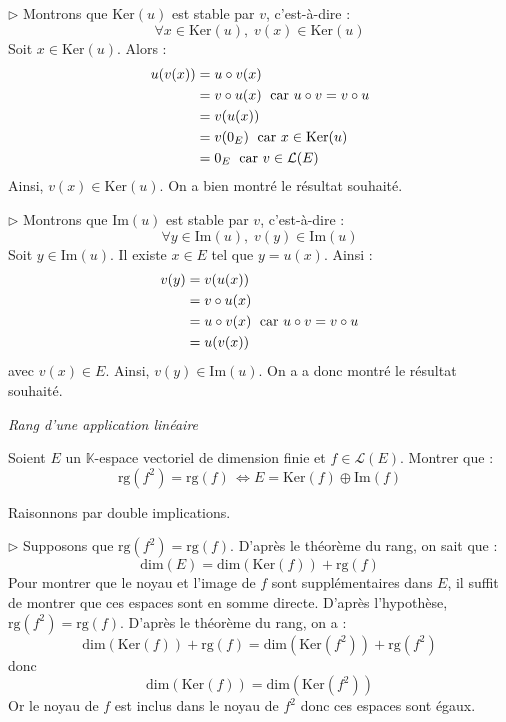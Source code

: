 \documentclass[a4paper,10pt]{report}
\begin{document}
\noindent $\rhd$ Montrons que $\textrm{Ker}(u)$ est stable par $v$, c'est-à-dire :
$$ \forall x \in \textrm{Ker}(u), \; v(x) \in \textrm{Ker}(u)$$
Soit $x \in \textrm{Ker}(u)$. Alors :
\begin{align*}
u (v(x)) & = u \circ v (x) \\
& = v \circ u (x) \; \hbox{ car } u \circ v = v \circ u \\
& = v(u(x)) \\
& = v(0_E) \; \hbox{ car } x \in \textrm{Ker}(u) \\
& = 0_E \; \hbox{ car } v \in \mathcal{L}(E)
\end{align*}
Ainsi, $v(x) \in \textrm{Ker}(u)$. On a bien montré le résultat souhaité.

\medskip

\noindent $\rhd$ Montrons que $\textrm{Im}(u)$ est stable par $v$, c'est-à-dire :
$$ \forall y \in \textrm{Im}(u), \; v(y) \in \textrm{Im}(u)$$
Soit $y \in \textrm{Im}(u)$. Il existe $x \in E$ tel que $y = u(x)$. Ainsi :
\begin{align*}
v(y) & = v (u(x)) \\
& = v \circ u(x) \\
& = u \circ v(x) \; \hbox{ car } u \circ v = v \circ u \\
& = u (v(x)) 
\end{align*}
avec $v(x) \in E$. Ainsi, $v(y) \in \textrm{Im}(u)$. On a a donc montré le résultat souhaité.


\medskip


\begin{center}
\textit{{ {\large Rang d'une application linéaire}}}
\end{center}

\medskip


\begin{Exa} Soient $E$ un $\mathbb{K}$-espace vectoriel de dimension finie et $f \in \mathcal{L}(E)$. Montrer que :
$$ \textrm{rg}(f^2 ) =  \textrm{rg}( f ) \, \Longleftrightarrow E = \textrm{Ker}(f) \oplus \textrm{Im}(f) $$
\end{Exa}

\corr Raisonnons par double implications.

\medskip

\noindent $\rhd$ Supposons que $\textrm{rg}(f^2 ) =  \textrm{rg}( f )$. D'après le théorème du rang, on sait que :
$$ \textrm{dim}(E) = \textrm{dim}( \textrm{Ker}(f)) + \textrm{rg}( f )$$
Pour montrer que le noyau et l'image de $f$ sont supplémentaires dans $E$, il suffit de montrer que ces espaces sont en somme directe. D'après l'hypothèse, $\textrm{rg}(f^2 ) =  \textrm{rg}( f )$. D'après le théorème du rang, on a :
$$ \textrm{dim}( \textrm{Ker}(f)) + \textrm{rg}( f ) = \textrm{dim}( \textrm{Ker}(f^2)) + \textrm{rg}( f^2)$$
donc 
$$ \textrm{dim}( \textrm{Ker}(f)) = \textrm{dim}( \textrm{Ker}(f^2))$$
Or le noyau de $f$ est inclus dans le noyau de $f^2$ donc ces espaces sont égaux.
\end{document}

